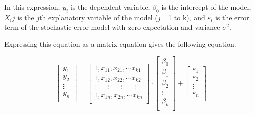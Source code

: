 \documentclass[12pt]{article}
\begin{document}
In this expression, $y_i$ is the dependent variable, $\beta_0$ is the intercept of the model, $X_ij$ is the $j$th explanatory variable of the model ($j$= 1 to k), and $\varepsilon_i$ is the error term of the stochastic error model with zero expectation and variance $\sigma^2$.

Expressing this equation as a matrix equation gives the following equation.

\begin{equation}
    \label{eq5}
    \left[
        \begin{array} {c}
            y_1    \\
            y_2    \\
            \vdots \\
            y_n    \\
        \end{array}
        \right]
    =
    \left[
        \begin{array} {c}
            1,x_{11},x_{21},\cdots x_{k1}                                         \\
            1,x_{12},x_{22},\cdots x_{k2}                                         \\
            \vdots \hspace{20pt} \vdots \hspace{20pt} \vdots \hspace{20pt} \vdots \\
            1,x_{1n},x_{2n},\cdots x_{kn}                                         \\
        \end{array}
        \right]
    \cdot
    \left[
        \begin{array} {c}
            \beta_0 \\
            \beta_1 \\
            \beta_2 \\
            \vdots  \\
            \beta_k \\
        \end{array}
        \right]
    +
    \left[
        \begin{array} {c}
            \varepsilon_1 \\
            \varepsilon_2 \\
            \vdots        \\
            \varepsilon_n \\
        \end{array}
        \right]
\end{equation}
\end{document}
